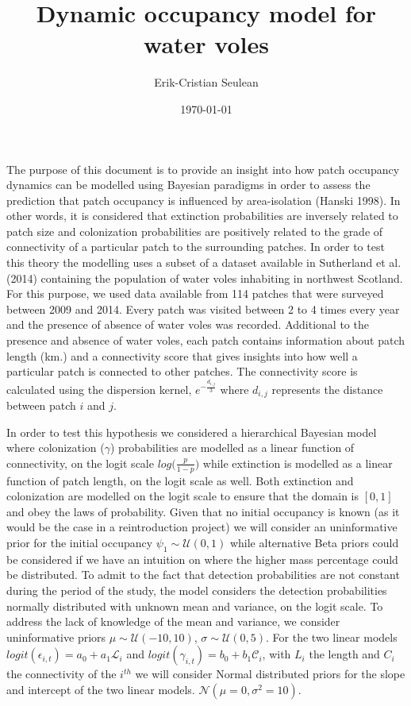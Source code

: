 \documentclass[12pt,a4paper]{article}
\author{Erik-Cristian Seulean}
\title{Dynamic occupancy model for water voles}
\date{\today}
\begin{document}
\newpage
\maketitle
The purpose of this document is to provide an insight into how patch occupancy dynamics can be modelled using Bayesian paradigms in order to assess the prediction that patch occupancy is influenced by area-isolation (Hanski 1998). In other words, it is considered that extinction probabilities are inversely related to patch size and colonization probabilities are positively related to the grade of connectivity of a particular patch to the surrounding patches. In order to test this theory the modelling uses a subset of a dataset available in Sutherland et al. (2014) containing the population of water voles inhabiting in northwest Scotland. For this purpose, we used data available from 114 patches that were surveyed between 2009 and 2014. Every patch was visited between 2 to 4 times every year and the presence of absence of water voles was recorded. Additional to the presence and absence of water voles, each patch contains information about patch length (km.) and a connectivity score that gives insights into how well a particular patch is connected to other patches. The connectivity score is calculated using the dispersion kernel, $e^{-\frac{d_{i,j}}{3}}$ where $d_{i, j}$ represents the distance between patch $i$ and $j$.

In order to test this hypothesis we considered a hierarchical Bayesian model where colonization ($\gamma$) probabilities are modelled as a linear function of connectivity, on the logit scale $log\big(\frac{p}{1-p}\big)$ while extinction is modelled as a linear function of patch length, on the logit scale as well. Both extinction and colonization are modelled on the logit scale to ensure that the domain is $[0, 1]$ and obey the laws of probability. Given that no initial occupancy is known (as it would be the case in a reintroduction project) we will consider an uninformative prior for the initial occupancy $\psi_{1} \sim \mathcal{U}(0, 1)$ while alternative Beta priors could be considered if we have an intuition on where the higher mass percentage could be distributed. To admit to the fact that detection probabilities are not constant during the period of the study, the model considers the detection probabilities normally distributed with unknown mean and variance, on the logit scale. To address the lack of knowledge of the mean and variance, we consider uninformative priors $\mu \sim \mathcal{U}(-10, 10)$, $\sigma \sim \mathcal{U}(0, 5)$. For the two linear models $logit(\epsilon_{i,t}) = a_{0} + a_{1}\mathcal{L}_{i}$ and $logit(\gamma_{i, t}) = b_{0} + b_{1}\mathcal{C}_{i}$, with $L_{i}$ the length and $C_{i}$ the connectivity of the $i^{th}$ we will consider Normal distributed priors for the slope and intercept of the two linear models. $\mathcal{N}(\mu=0, \sigma^{2}=10)$.
\end{document}
